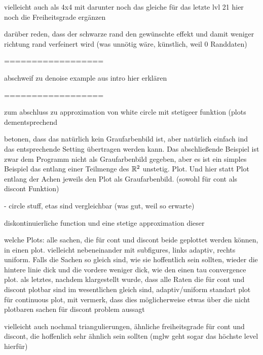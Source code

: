 vielleicht auch als 4x4 mit darunter noch das gleiche für das letzte lvl 21
hier noch die Freiheitsgrade ergänzen

darüber reden, dass der schwarze rand den gewünschte effekt und damit weniger
richtung rand verfeinert wird (was unnötig wäre, künstlich, weil 0 Randdaten)

==================

abschweif zu denoise example aus intro hier erklären

==================

zum abschluss zu approximation von white circle mit stetigeer funktion (plots
dementsprechend

betonen, dass das natürlich kein Graufarbenbild ist, aber natürlich einfach
ind das entsprechende Setting übertragen werden kann.
Das abschließende Beispiel ist zwar dem Programm nicht als Graufarbenbild 
gegeben, aber es ist ein simples Beispiel das entlang einer Teilmenge des
$\mathbb{R}^2$ unstetig. Plot. Und hier statt Plot entlang der Achen jeweils
den Plot als Graufarbenbild. (sowohl für cont als discont Funktion)

  - circle stuff, etas sind vergleichbar (was gut, weil so erwarte)

diskontinuierliche function und eine stetige approximation dieser

welche Plots: 
alle sachen, die für cont und discont beide geplottet werden können, in einen
plot. vielleicht nebeneinander mit subfigures, links adaptiv, rechts uniform.
Falls die Sachen so gleich sind, wie sie hoffentlich sein sollten, wieder
die hintere linie dick und die vordere weniger dick, wie den einen tau
convergence plot. 
als letztes, nachdem klargestellt wurde, dass alle Raten die für cont und
discont plotbar sind im wesentlichen gleich sind, adaptiv/uniform standart plot
für continuous plot, mit vermerk, dass dies möglicherweise etwas über die nicht
plotbaren sachen für discont problem aussagt

vielleicht auch nochmal triangulierungen, ähnliche freiheitsgrade für cont 
und discont, die hoffenlich sehr ähnlich sein sollten (mglw geht sogar das 
höchste level hierfür)

